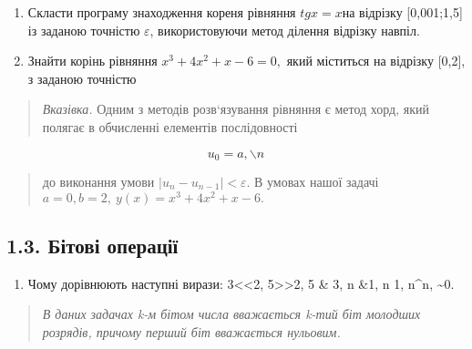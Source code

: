\documentclass[]{article}
\begin{document}
\begin{enumerate}
\def\labelenumi{\arabic{enumi})}
\item
  Скласти програму знаходження кореня рівняння \(tgx = x\)на відрізку
  {[}0,001;1,5{]} із заданою точністю \(\varepsilon\), використовуючи
  метод ділення відрізку навпіл.
\item
  Знайти корінь рівняння \(x^{3} + 4x^{2} + x - 6 = 0,\) який міститься
  на відрізку {[}0,2{]}, з заданою точністю
\end{enumerate}

\begin{quote}
\emph{\emph{Вказівка.}} Одним з методів розв`язування рівняння є метод
хорд, який полягає в обчисленні елементів послідовності
\end{quote}

\[u_{0} = a,\backslash n\]

\begin{quote}
до виконання умови \(\left| u_{n} - u_{n - 1} \right| < \varepsilon\). В
умовах нашої задачі \(a = 0,b = 2,\ y(x) = x^{3} + 4x^{2} + x - 6.\)
\end{quote}

\subsection{1.3. Бітові
операції}\label{ux431ux456ux442ux43eux432ux456-ux43eux43fux435ux440ux430ux446ux456ux457}

\begin{enumerate}
\def\labelenumi{\arabic{enumi})}
\item
  Чому дорівнюють наступні вирази: 3\textless{}\textless{}2,
  5\textgreater{}\textgreater{}2, 5 \& 3, n \&1, n \textbar{} 1, n\^{}n,
  \textasciitilde{}0.
\end{enumerate}

\begin{quote}
\emph{В даних задачах k-м бітом числа вважається k-тий біт молодших
розрядів, причому перший біт вважається нульовим. }
\end{quote}
\end{document}
